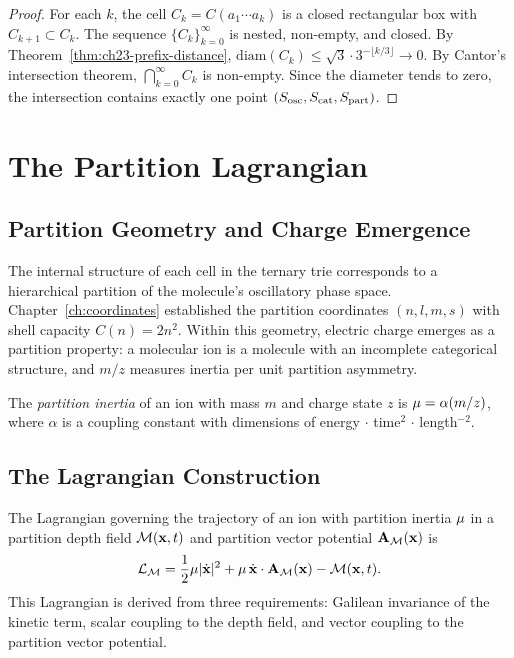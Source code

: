 \begin{proof}
For each $k$, the cell $C_k = C(a_1 \cdots a_k)$ is a closed rectangular
box with $C_{k+1} \subset C_k$.  The sequence $\{C_k\}_{k=0}^\infty$ is
nested, non-empty, and closed.  By Theorem~\ref{thm:ch23-prefix-distance},
$\mathrm{diam}(C_k) \leq \sqrt{3} \cdot 3^{-\lfloor k/3 \rfloor} \to 0$.
By Cantor's intersection theorem, $\bigcap_{k=0}^\infty C_k$ is non-empty.
Since the diameter tends to zero, the intersection contains exactly one point
$(S_{\mathrm{osc}}, S_{\mathrm{cat}}, S_{\mathrm{part}})$.
\end{proof}

\section{The Partition Lagrangian}
\label{sec:ch23-lagrangian}

\subsection{Partition Geometry and Charge Emergence}
\label{sec:ch23-geometry}

The internal structure of each cell in the ternary trie corresponds to a
hierarchical partition of the molecule's oscillatory phase space.
Chapter~\ref{ch:coordinates} established the partition coordinates
$(n, l, m, s)$ with shell capacity $C(n) = 2n^2$.  Within this geometry,
electric charge emerges as a partition property: a molecular ion is a molecule
with an incomplete categorical structure, and $m/z$ measures inertia per unit
partition asymmetry.

\begin{definition}
\label{def:ch23-inertia}
The \emph{partition inertia} of an ion with mass $m$ and charge state $z$ is
$\mu = \alpha(m/z)$, where $\alpha$ is a coupling constant with
dimensions of energy $\cdot$ time$^2$ $\cdot$ length$^{-2}$.
\end{definition}

\subsection{The Lagrangian Construction}
\label{sec:ch23-construction}

\begin{theorem}
\label{thm:ch23-lagrangian}
The Lagrangian governing the trajectory of an ion with partition inertia
$\mu$ in a partition depth field $\mathcal{M}(\mathbf{x}, t)$ and partition
vector potential $\mathbf{A}_{\mathcal{M}}(\mathbf{x})$ is
\begin{equation}
\label{eq:ch23-lagrangian}
  \mathcal{L}_{\mathcal{M}} = \frac{1}{2}\mu|\dot{\mathbf{x}}|^2
               + \mu\,\dot{\mathbf{x}} \cdot \mathbf{A}_{\mathcal{M}}(\mathbf{x})
               - \mathcal{M}(\mathbf{x}, t).
\end{equation}
This Lagrangian is derived from three requirements: Galilean invariance of
the kinetic term, scalar coupling to the depth field, and vector coupling to
the partition vector potential.
\end{theorem}

